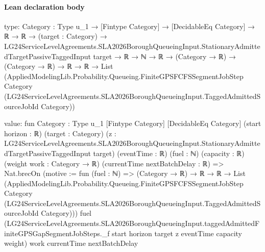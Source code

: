 \documentclass[10pt]{article}
\begin{document}
\paragraph{Lean declaration body}
\begin{ReviewVerbatim}
type:
{Category : Type u_1} →
  [Fintype Category] →
    [DecidableEq Category] →
      ℝ →
        ℝ →
          (target : Category) →
            LG24ServiceLevelAgreements.SLA2026BoroughQueueingInput.StationaryAdmittedTargetPassiveTaggedInput target →
              ℝ →
                ℕ →
                  ℝ →
                    (Category → ℝ) →
                      (Category → ℝ) →
                        ℝ →
                          ℝ →
                            List
                              (AppliedModelingLib.Probability.Queueing.FiniteGPSFCFSSegmentJobStep Category
                                (LG24ServiceLevelAgreements.SLA2026BoroughQueueingInput.TaggedAdmittedSourceJobId
                                  Category))

value:
fun {Category : Type u_1} [Fintype Category] [DecidableEq Category] (start horizon : ℝ) (target : Category)
    (z : LG24ServiceLevelAgreements.SLA2026BoroughQueueingInput.StationaryAdmittedTargetPassiveTaggedInput target)
    (eventTime : ℝ) (fuel : ℕ) (capacity : ℝ) (weight work : Category → ℝ) (currentTime nextBatchDelay : ℝ) =>
  Nat.brecOn (motive := fun (fuel : ℕ) =>
    (Category → ℝ) →
      ℝ →
        ℝ →
          List
            (AppliedModelingLib.Probability.Queueing.FiniteGPSFCFSSegmentJobStep Category
              (LG24ServiceLevelAgreements.SLA2026BoroughQueueingInput.TaggedAdmittedSourceJobId Category)))
    fuel
    (LG24ServiceLevelAgreements.SLA2026BoroughQueueingInput.taggedAdmittedFiniteGPSGapSegmentJobSteps._f start horizon
      target z eventTime capacity weight)
    work currentTime nextBatchDelay
\end{ReviewVerbatim}
\end{document}
